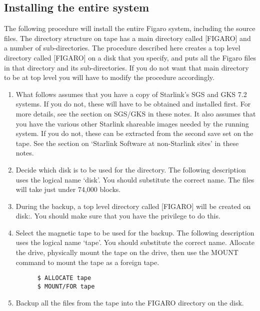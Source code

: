 \subsection{Installing the entire system}

The following procedure will install the entire Figaro system, including the
source files. The directory structure on tape has a main directory called
[FIGARO] and a number of  sub-directories. The procedure described here creates
a top level directory called [FIGARO] on a disk that you specify, and puts all
the Figaro files in that directory and its sub-directories. If you do not want
that main directory to be at top level you will have to modify the procedure
accordingly.

\begin{enumerate}

\item What follows assumes that you have a copy of  Starlink's  SGS and  GKS 
7.2  systems.  If you do not, these will have to be obtained and installed
first. For  more  details,  see  the section  on SGS/GKS in these notes.  It
also assumes that you have the various other Starlink shareable  images  needed 
by the  running  system. If you do not, these can be extracted from the second
save set on the tape. See  the  section  on `Starlink Software at non-Starlink
sites' in these notes.

\item Decide which disk is to  be  used  for  the  directory. The following 
description  uses  the  logical  name `disk'.  You should substitute the
correct name.  The files will take just under 74,000 blocks.

\item During the backup, a top level directory called [FIGARO] will be  created
on disk:.  You should make sure that you have the privilege to do this.

\item Select the magnetic tape to be  used  for  the  backup. The following 
description  uses  the  logical  name `tape'.  You should substitute the 
correct  name. Allocate  the  drive, physically  mount  the  tape on the drive,
then use the MOUNT command to mount the tape as a foreign tape.

\begin{verbatim}
      $ ALLOCATE tape
      $ MOUNT/FOR tape
\end{verbatim}

\item Backup all the files from the tape into the FIGARO  directory on the
disk.


\end{enumerate}
